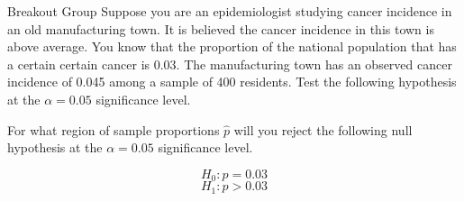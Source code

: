 \documentclass{beamer}
\begin{document}
\begin{frame}{Breakout Group}
	Suppose you are an epidemiologist studying cancer incidence in an old manufacturing town. It is believed the cancer incidence in this town is above average. You know that the proportion of the national population that has a certain certain cancer is 0.03. The manufacturing town has an observed cancer incidence of 0.045 among a sample of 400 residents. Test the following hypothesis at the $\alpha = 0.05$ significance level.

	For what region of sample proportions $\hat{p}$ will you reject the following null hypothesis at the $\alpha = 0.05$ significance level.

		
	\[ 
		H_0: p = 0.03
	\]
	\[ 
		H_1: p > 0.03
	\]
	

\end{frame}
\end{document}
